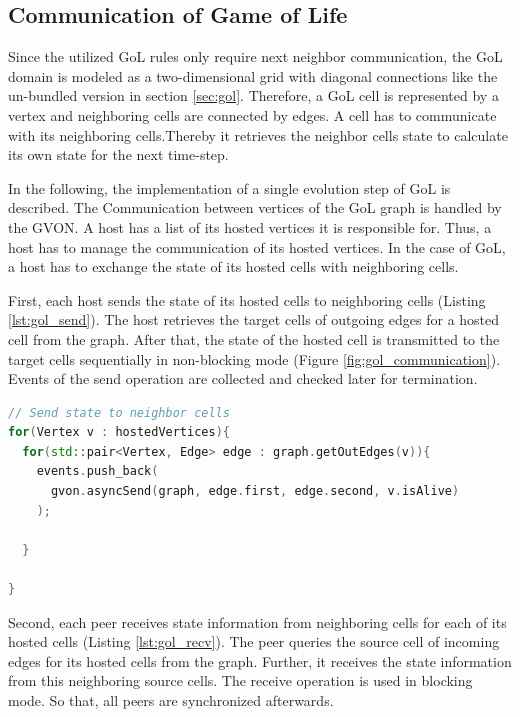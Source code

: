 \subsection{Communication of Game of Life}
\label{sec:gol_imp}
Since the utilized GoL rules only require next neighbor communication,
the GoL domain is modeled as a two-dimensional grid with diagonal
connections like the un-bundled version in section
\ref{sec:gol}. Therefore, a GoL cell is represented by a vertex and
neighboring cells are connected by edges. A cell has to communicate
with its neighboring cells.Thereby it retrieves the neighbor cells
state to calculate its own state for the next time-step.

In the following, the implementation of a single evolution step of GoL
is described. The Communication between vertices of the GoL graph
is handled by the GVON. A host has a list of its hosted vertices it is
responsible for. Thus, a host has to manage the communication of its
hosted vertices. In the case of GoL, a host has to exchange the state
of its hosted cells with neighboring cells.

First, each host sends the state of its hosted cells to neighboring
cells (Listing \ref{lst:gol_send}). The host retrieves the target
cells of outgoing edges for a hosted cell from the graph. After that,
the state of the hosted cell is transmitted to the target cells
sequentially in non-blocking mode (Figure
\ref{fig:gol_communication}). Events of the send operation are
collected and checked later for termination.

\begin{lstlisting}[language=C++, label=lst:gol_send, caption={\ }]
// Send state to neighbor cells
for(Vertex v : hostedVertices){
  for(std::pair<Vertex, Edge> edge : graph.getOutEdges(v)){
    events.push_back(
      gvon.asyncSend(graph, edge.first, edge.second, v.isAlive)
    );

  }

}
\end{lstlisting}

\noindent Second, each peer receives state information from
neighboring cells for each of its hosted cells (Listing
\ref{lst:gol_recv}). The peer queries the source cell of incoming
edges for its hosted cells from the graph. Further, it receives the
state information from this neighboring source cells.  The receive
operation is used in blocking mode. So that, all peers are
synchronized afterwards.

